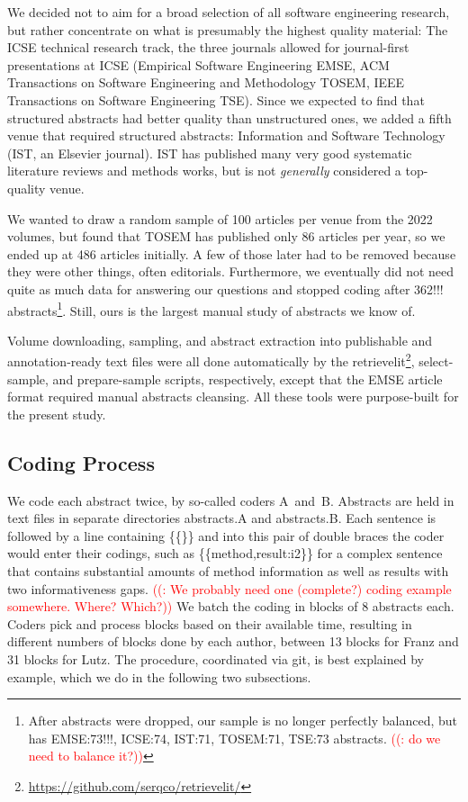 \documentclass[10pt,journal,compsoc]{IEEEtran}
\newcommand{\Prg}[1]{\bgroup\ttfamily #1\egroup}  %
\newcounter{todonumber}
\newcommand{\Todo}[1]{\stepcounter{todonumber}\textcolor{red}{\sffamily ((\arabic{todonumber}: #1))}}
\begin{document}
We decided not to aim for a broad selection of all software engineering research,
but rather concentrate on what is presumably the highest quality material:
The ICSE technical research track,
the three journals allowed for journal-first presentations at ICSE
(Empirical Software Engineering EMSE,
ACM Transactions on Software Engineering and Methodology TOSEM,
IEEE Transactions on Software Engineering TSE).
Since we expected to find that structured abstracts had better quality
than unstructured ones, we added a fifth venue that required structured abstracts:
Information and Software Technology (IST, an Elsevier journal).
IST has published many very good systematic literature reviews and methods works,
but is not \emph{generally} considered a top-quality venue.

We wanted to draw a random sample of 100 articles per venue from the
2022 volumes, but found that TOSEM has published only 86 articles per year,
so we ended up at 486 articles initially.
A few of those later had to be removed because they were other things,
often editorials.
Furthermore, we eventually did not need quite as much data for answering our
questions and stopped coding after 362!!! abstracts\footnote{After abstracts 
	were dropped, our sample is no longer perfectly balanced, but has 
    EMSE:73!!!, ICSE:74, IST:71, TOSEM:71, TSE:73 abstracts. \Todo{do we need to balance it?}}.
Still, ours is the largest manual study of abstracts we know of.

Volume downloading, sampling, and abstract extraction into publishable
and annotation-ready text files were all done automatically by the
retrievelit\footnote{\url{https://github.com/serqco/retrievelit/}},
select-sample, and prepare-sample scripts, respectively, except
that the EMSE article format required manual abstracts cleansing.
All these tools were purpose-built for the present study.


\subsection{Coding Process}\label{meth_coding}

We code each abstract twice, by so-called coders A~and~B.
Abstracts are held in text files in separate directories \Prg{abstracts.A} and \Prg{abstracts.B}.
Each sentence is followed by a line containing \Prg{\{\{\}\}} and into this pair of
double braces the coder would enter their codings,
such as \Prg{\{\{method,result:i2\}\}} for a complex sentence that contains substantial
amounts of method information as well as results with two informativeness gaps.
\Todo{We probably need one (complete?) coding example somewhere. Where? Which?}
We batch the coding in blocks of 8 abstracts each.
Coders pick and process blocks based on their available time, resulting in different numbers of blocks
done by each author, between 13 blocks for Franz and 31 blocks for Lutz. 
The procedure, coordinated via git, is best explained by example,
which we do in the following two subsections.
\end{document}
